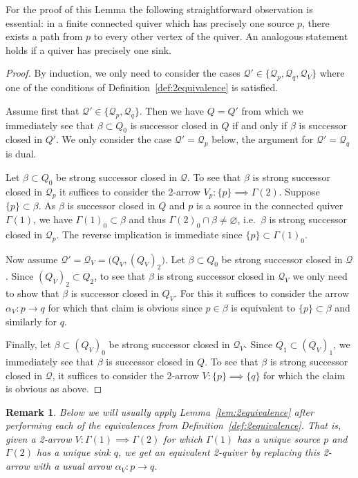 \documentclass{amsart}
\newtheorem{remark}[theorem]{Remark}
\numberwithin{equation}{section}
\newcommand{\cQ}{\mathcal{Q}}
\begin{document}
For the proof of this Lemma the following straightforward observation is essential: in a finite connected quiver which has precisely one source $p$, there exists a path from $p$ to every other vertex of the quiver.
An analogous statement holds if a quiver has precisely one sink. 
\begin{proof}
  By induction, we only need to consider the cases $\cQ'\in\{\cQ_p,\cQ_q,\cQ_V\}$ where one of the conditions of Definition~\ref{def:2equivalence} is satisfied.

  Assume first that $\cQ'\in\{\cQ_p,\cQ_q\}$.
  Then we have $Q=Q'$ from which we immediately see that $\beta\subset Q_0$ is successor closed in $Q$ if and only if $\beta$ is successor closed in $Q'$.
  We only consider the case $\cQ'=\cQ_p$ below, the argument for $\cQ'=\cQ_q$ is dual.

  Let $\beta\subset Q_0$ be strong successor closed in $\cQ$.
  To see that $\beta$ is strong successor closed in $\cQ_p$ it suffices to consider the 2-arrow $V_p:\{p\}\implies\Gamma(2)$.
  Suppose $\{p\}\subset\beta$.
  As $\beta$ is successor closed in $Q$ and $p$ is a source in the connected quiver $\Gamma(1)$, we have $\Gamma(1)_0\subset\beta$ and thus $\Gamma(2)_0\cap\beta\ne\varnothing$, i.e.\ $\beta$ is strong successor closed in $\cQ_p$.
  The reverse implication is immediate since $\{p\}\subset\Gamma(1)_0$.

  Now assume $\cQ'=\cQ_V=\big(Q_V,(Q_V)_2\big)$. 
  Let $\beta\subset Q_0$ be strong successor closed in $\cQ$.
  Since $(Q_V)_2\subset Q_2$, to see that $\beta$ is strong successor closed in $\cQ_V$ we only need to show that $\beta$ is successor closed in $Q_V$.  
  For this it suffices to consider the arrow $\alpha_V:p\to q$ for which that claim is obvious since $p\in\beta$ is equivalent to $\{p\}\subset\beta$ and similarly for $q$.

  Finally, let $\beta\subset(Q_V)_0$ be strong successor closed in $\cQ_V$.
  Since $Q_1\subset(Q_V)_1$, we immediately see that $\beta$ is successor closed in $Q$.
  To see that $\beta$ is strong successor closed in $\cQ$, it suffices to consider the 2-arrow $V:\{p\}\implies\{q\}$ for which the claim is obvious as above.
\end{proof}

\begin{remark}
  Below we will usually apply Lemma~\ref{lem:2equivalence} after performing each of the equivalences from Definition~\ref{def:2equivalence}.
  That is, given a 2-arrow $V:\Gamma(1)\implies\Gamma(2)$ for which $\Gamma(1)$ has a unique source $p$ and $\Gamma(2)$ has a unique sink $q$, we get an equivalent 2-quiver by replacing this 2-arrow with a usual arrow $\alpha_V:p\to q$.
\end{remark}
\end{document}
